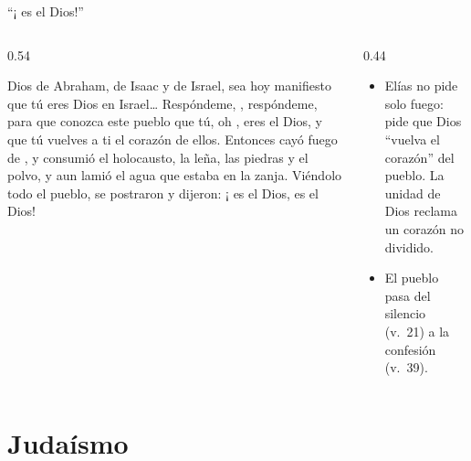 \begin{frame}{``¡\SENOR{} es el Dios!''}
\begin{columns}[t,onlytextwidth]
\begin{column}{0.54\textwidth}
\begin{cita}[fontupper=\scriptsize\itshape]\SENOR{} Dios de Abraham, de Isaac y de Israel, sea hoy manifiesto que tú eres Dios en Israel\ldots{} Respóndeme, \SENOR, respóndeme, para que conozca este pueblo que tú, oh \SENOR, eres el Dios, y que tú vuelves a ti el corazón de ellos. Entonces cayó fuego de \SENOR, y consumió el holocausto, la leña, las piedras y el polvo, y aun lamió el agua que estaba en la zanja. Viéndolo todo el pueblo, se postraron y dijeron: ¡\SENOR{} es el Dios, \SENOR{} es el Dios!\end{cita}
\end{column}
\begin{column}{0.44\textwidth}\small
\begin{itemize}
\item Elías no pide solo fuego: pide que Dios ``vuelva el corazón'' del pueblo. La unidad de Dios reclama un corazón no dividido.
\item El pueblo pasa del silencio (v.~21) a la confesión (v.~39).
\end{itemize}
\end{column}
\end{columns}
\end{frame}

\section{Judaísmo}

